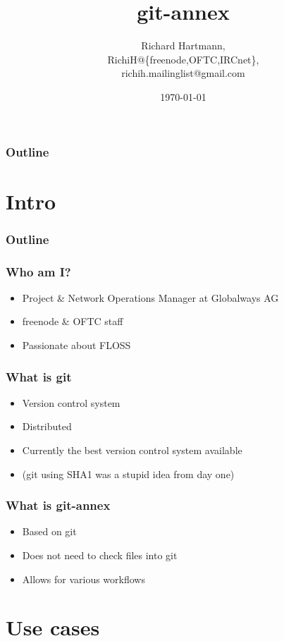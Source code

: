\documentclass[t]{beamer}
\title{git-annex}
\author{Richard Hartmann,\\
RichiH@\{freenode,OFTC,IRCnet\},\\
richih.mailinglist@gmail.com}
\date{\today}
\begin{document}
\begin{frame}
	\titlepage
\end{frame}

\begin{frame}
	\frametitle{Outline}
	\tableofcontents
\end{frame}


\section{Intro}
\begin{frame}
	\frametitle{Outline}
	\tableofcontents[currentsection]
\end{frame}

\begin{frame}
	\frametitle{Who am I?}
	\begin{itemize}
		\item Project \& Network Operations Manager at Globalways AG
		\item freenode \& OFTC staff
		\item Passionate about FLOSS
	\end{itemize}
\end{frame}

\begin{frame}
	\frametitle{What is git}
	\begin{itemize}
		\item Version control system
		\item Distributed
		\item Currently the best version control system available
		\item (git using SHA1 was a stupid idea from day one)
	\end{itemize}
\end{frame}

\begin{frame}
	\frametitle{What is git-annex}
	\begin{itemize}
		\item Based on git
		\item Does not need to check files into git
		\item Allows for various workflows
	\end{itemize}
\end{frame}


\section{Use cases}
\end{document}
